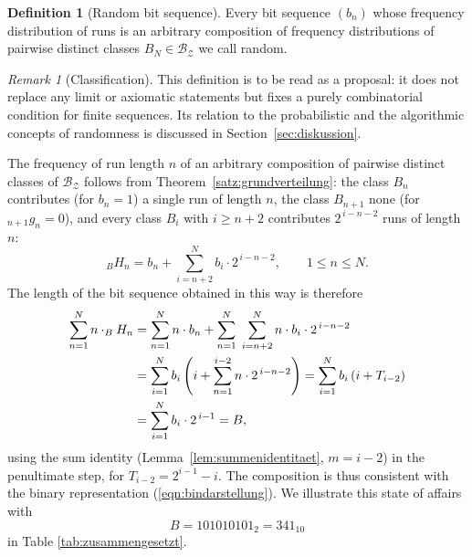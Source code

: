 \documentclass[11pt,a4paper]{scrartcl}
\theoremstyle{plain}
\theoremstyle{definition}
\newtheorem{defi}[satz]{Definition}
\theoremstyle{remark}
\newtheorem{bem}[satz]{Remark}
\begin{document}
\begin{defi}[Random bit sequence]\label{defi:zufaellig}
Every bit sequence $(b_n)$ whose frequency distribution of runs is an
arbitrary composition of frequency distributions of pairwise distinct
classes $B_N \in \mathcal{B_Z}$ we call random.
\end{defi}
\begin{bem}[Classification]\label{bem:einordnung}
This definition is to be read as a proposal: it does not replace any
limit or axiomatic statements but fixes a purely combinatorial
condition for finite sequences. Its relation to the probabilistic
and the algorithmic concepts of randomness is discussed in
Section~\ref{sec:diskussion}.
\end{bem}

The frequency of run length $n$ of an arbitrary composition of
pairwise distinct classes of $\mathcal{B_Z}$ follows from
Theorem~\ref{satz:grundverteilung}: the class $B_n$ contributes (for
$b_n=1$) a single run of length $n$, the class $B_{n+1}$ none (for
$_{n+1}g_n=0$), and every class $B_i$ with $i\geq n+2$ contributes
$2^{\,i-n-2}$ runs of length $n$:
\begin{equation}\label{eqn:hnformel}
  _BH_n=b_n+\sum_{i=n+2}^{N} b_{i}\cdot 2^{\,i-n-2},\qquad 1\leq n\leq N.
\end{equation}
The length of the bit sequence obtained in this way is therefore
\begin{align}
  \sum_{n=1}^{N} n\cdot _BH_n
  &= \sum_{n=1}^{N} n\cdot b_n+\sum_{n=1}^{N}\;\sum_{i=n+2}^{N}
     n\cdot b_{i}\cdot 2^{\,i-n-2}\notag\\
  &= \sum_{i=1}^{N} b_i\left(i+\sum_{n=1}^{i-2} n\cdot 2^{\,i-n-2}\right)
   = \sum_{i=1}^{N} b_i\left(i+T_{i-2}\right)\notag\\
  &= \sum_{i=1}^{N} b_i\cdot 2^{\,i-1}=B,\label{eqn:laengekonsistenz}
\end{align}
using the sum identity (Lemma~\ref{lem:summenidentitaet},
$m=i-2$) in the penultimate step, for $T_{i-2}=2^{i-1}-i$. The
composition is thus consistent with the binary representation
(\ref{eqn:bindarstellung}). We illustrate this state of affairs with
\begin{equation}
  B=101010101_2=341_{10}
\end{equation}
in Table \ref{tab:zusammengesetzt}.
\end{document}
